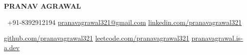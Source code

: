\begin{center}
    \textbf{\Huge \scshape PRANAV AGRAWAL} \\ \vspace{1pt}
\end{center}

\begin{center}        
     \ \small +91-8392912194 \quad
    \href{mailto:pranavagrawal321@gmail.com}{ \underline{pranavagrawal321@gmail.com}} \quad
    \href{https://www.linkedin.com/in/pranavagrawal321}{ \underline{linkedin.com/pranavagrawal321}} \quad


    \href{https://github.com/pranavagrawal321}{ \underline{github.com/pranavagrawal321}} \quad
    \href{https://leetcode.com/pranavagrawal321}{ \underline{leetcode.com/pranavagrawal321}} \quad
    \href{https://pranavagrawal.is-a.dev/}{ \underline{pranavagrawal.is-a.dev}} \quad
    
\end{center}
